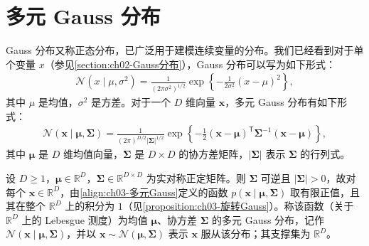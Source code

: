 \documentclass[../../main.tex]{subfiles}
\begin{document}
\section{多元 Gauss 分布}\label{section:ch03-多元Gauss分布}

Gauss 分布又称正态分布，已广泛用于建模连续变量的分布。我们已经看到对于单个变量 $x$（参见\cref{section:ch02-Gauss分布}），Gauss 分布可以写为如下形式：
\begin{align}
\mathcal{N}(x\mid\mu,\sigma^{2})=\frac{1}{(2\pi\sigma^{2})^{1/2}}\exp\left\{-\frac{1}{2\sigma^{2}}(x-\mu)^{2}\right\},
\label{align:ch03-一元Gauss}
\end{align}
其中 $\mu$ 是均值，$\sigma^{2}$ 是方差。对于一个 $D$ 维向量 $\boldsymbol{x}$，多元 Gauss 分布有如下形式：
\begin{align}
\mathcal{N}(\boldsymbol{x}\mid\boldsymbol{\mu},\boldsymbol{\Sigma})=\frac{1}{(2\pi)^{D/2}\lvert\boldsymbol{\Sigma}\rvert^{1/2}}\exp\left\{-\frac{1}{2}(\boldsymbol{x}-\boldsymbol{\mu})^{\mathsf{T}}\boldsymbol{\Sigma}^{-1}(\boldsymbol{x}-\boldsymbol{\mu})\right\},
\label{align:ch03-多元Gauss}
\end{align}
其中 $\boldsymbol{\mu}$ 是 $D$ 维均值向量，$\boldsymbol{\Sigma}$ 是 $D\times D$ 的协方差矩阵，$\lvert\boldsymbol{\Sigma}\rvert$ 表示 $\boldsymbol{\Sigma}$ 的行列式。

\begin{definition}[多元 Gauss 分布]\label{definition:ch03-多元Gauss分布}
设 $D\geqslant1$，$\boldsymbol{\mu}\in\mathbb{R}^{D}$，$\boldsymbol{\Sigma}\in\mathbb{R}^{D\times D}$ 为实对称正定矩阵。则 $\boldsymbol{\Sigma}$ 可逆且 $\lvert\boldsymbol{\Sigma}\rvert>0$，故对每个 $\boldsymbol{x}\in\mathbb{R}^{D}$，由\eqref{align:ch03-多元Gauss}定义的函数 $p(\boldsymbol{x}\mid\boldsymbol{\mu},\boldsymbol{\Sigma})$ 取有限正值，且其在整个 $\mathbb{R}^{D}$ 上的积分为 $1$（见\cref{proposition:ch03-旋转Gauss}）。称该函数（关于 $\mathbb{R}^{D}$ 上的 Lebesgue 测度）为均值 $\boldsymbol{\mu}$、协方差 $\boldsymbol{\Sigma}$ 的多元 Gauss 分布，记作 $\mathcal{N}(\boldsymbol{x}\mid\boldsymbol{\mu},\boldsymbol{\Sigma})$，并以 $\boldsymbol{x}\sim\mathcal{N}(\boldsymbol{\mu},\boldsymbol{\Sigma})$ 表示 $\boldsymbol{x}$ 服从该分布；其支撑集为 $\mathbb{R}^{D}$。
\end{definition}
\end{document}
